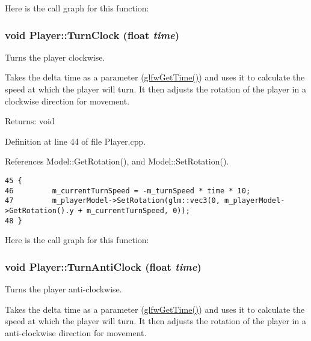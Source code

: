 Here is the call graph for this function:\hypertarget{class_player_f7ca641f9d3134c96b8039919b6f8876}{
\subsubsection[TurnClock]{\setlength{\rightskip}{0pt plus 5cm}void Player::TurnClock (float {\em time})}}
\label{class_player_f7ca641f9d3134c96b8039919b6f8876}


Turns the player clockwise. 

Takes the delta time as a parameter (\hyperlink{group__input_g03d4a1039b8662c71eeb40beea8cb622}{glfwGetTime()}) and uses it to calculate the speed at which the player will turn. It then adjusts the rotation of the player in a clockwise direction for movement.

\begin{Desc}
\item[Returns:]void \end{Desc}


Definition at line 44 of file Player.cpp.

References Model::GetRotation(), and Model::SetRotation().

\begin{Code}\begin{verbatim}45 {
46         m_currentTurnSpeed = -m_turnSpeed * time * 10;
47         m_playerModel->SetRotation(glm::vec3(0, m_playerModel->GetRotation().y + m_currentTurnSpeed, 0));
48 }
\end{verbatim}
\end{Code}




Here is the call graph for this function:\hypertarget{class_player_5e09b10a0ae73a3714267c87bd43f95d}{
\subsubsection[TurnAntiClock]{\setlength{\rightskip}{0pt plus 5cm}void Player::TurnAntiClock (float {\em time})}}
\label{class_player_5e09b10a0ae73a3714267c87bd43f95d}


Turns the player anti-clockwise. 

Takes the delta time as a parameter (\hyperlink{group__input_g03d4a1039b8662c71eeb40beea8cb622}{glfwGetTime()}) and uses it to calculate the speed at which the player will turn. It then adjusts the rotation of the player in a anti-clockwise direction for movement.

